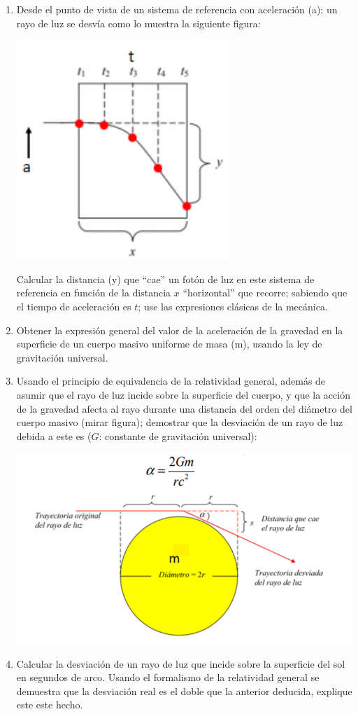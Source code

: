 \documentclass[12pt]{article}
\begin{document}
\begin{enumerate}
	\item  Desde el punto de vista de un sistema de referencia con aceleración (a); un rayo de luz se desvía como lo
	muestra la siguiente figura:	
	\begin{center}
			\includegraphics[scale=0.6, angle=0]{1}
	\end{center}
	Calcular la distancia (y) que “cae” un fotón de luz en este sistema de referencia en función de la distancia $x$
	“horizontal” que recorre; sabiendo que el tiempo de aceleración es $t$; use las expresiones clásicas de la
	mecánica.
	\item Obtener la expresión general del valor de la aceleración de la gravedad en la superficie de un cuerpo masivo
	uniforme de masa (m), usando la ley de gravitación universal.
	\item Usando el principio de equivalencia de la relatividad general, además de asumir que el rayo de luz incide
	sobre la superficie del cuerpo, y que la acción de la gravedad afecta al rayo durante una distancia del orden
	del diámetro del cuerpo masivo (mirar figura); demostrar que la desviación de un rayo de luz debida a este es
	($G$: constante de gravitación universal):
		\begin{center}
		\includegraphics[scale=0.6, angle=0]{2}
	\end{center}
	\item Calcular la desviación de un rayo de luz que incide sobre la superficie del sol en segundos de arco. Usando
	el formalismo de la relatividad general se demuestra que la desviación real es el doble que la anterior
	deducida, explique este este hecho.
\end{enumerate}
\end{document}
